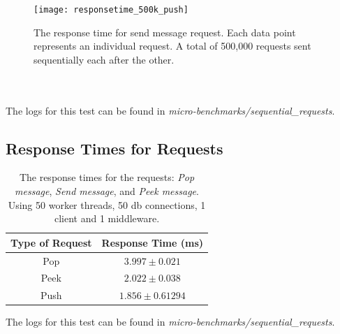 \documentclass{article}
\begin{document}
                \begin{figure}[H]
                    \centering
                    \centerline{\texttt{[image: responsetime\_500k\_push]}}
                    \caption{The response time for send message request. Each data point represents an individual request. A total of 500,000 requests sent sequentially each after the other.}
                    \label{fig:responsetime_500k_push}
                \end{figure}
                ~\\
                \\

        The logs for this test can be found in \textit{micro-benchmarks/sequential\_requests}.


        \subsection{Response Times for Requests}
                \begin{table}
                    \begin{tabular}{|c|c|}
                        \hline 
                        \textbf{Type of Request} & \textbf{Response Time} (ms) \\ 
                        \hline 
                        Pop & $3.997 \pm 0.021$ \\ 
                        \hline 
                        Peek & $2.022 \pm 0.038$ \\ 
                        \hline 
                        Push & $1.856 \pm 0.61294$ \\ 
                        \hline 
                    \end{tabular} 
                    \caption{The response times for the requests: \textit{Pop message}, \textit{Send message}, and \textit{Peek message}. Using 50 worker threads, 50 db connections, 1 client and 1 middleware.}
                    \label{tbl:response_times_requests}
                \end{table}

        The logs for this test can be found in \textit{micro-benchmarks/sequential\_requests}.
\end{document}
